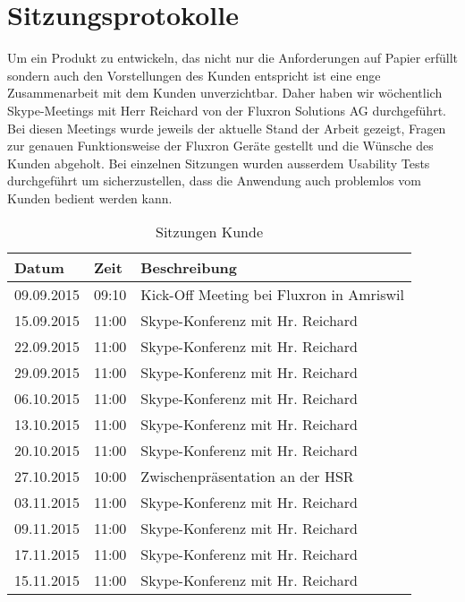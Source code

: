 \section{Sitzungsprotokolle}
\label{Sitzungsprotokolle}

Um ein Produkt zu entwickeln, das nicht nur die Anforderungen auf Papier erfüllt sondern auch den Vorstellungen des Kunden entspricht ist eine enge Zusammenarbeit mit dem Kunden unverzichtbar. Daher haben wir wöchentlich Skype-Meetings mit Herr Reichard von der Fluxron Solutions AG durchgeführt. Bei diesen Meetings wurde jeweils der aktuelle Stand der Arbeit gezeigt, Fragen zur genauen Funktionsweise der Fluxron Geräte gestellt und die Wünsche des Kunden abgeholt. Bei einzelnen Sitzungen wurden ausserdem Usability Tests durchgeführt um sicherzustellen, dass die Anwendung auch problemlos vom Kunden bedient werden kann.

\begin{table}[H]
\begin{tabularx}{\textwidth}{ l | l | X}
\textbf{Datum}& \textbf{Zeit} & \textbf{Beschreibung}\\ \hline
09.09.2015 & 09:10 & Kick-Off Meeting bei Fluxron in Amriswil\\ \hline
15.09.2015 & 11:00 & Skype-Konferenz mit Hr. Reichard\\ \hline
22.09.2015 & 11:00 & Skype-Konferenz mit Hr. Reichard\\ \hline
29.09.2015 & 11:00 & Skype-Konferenz mit Hr. Reichard\\ \hline
06.10.2015 & 11:00 & Skype-Konferenz mit Hr. Reichard\\ \hline
13.10.2015 & 11:00 & Skype-Konferenz mit Hr. Reichard\\ \hline
20.10.2015 & 11:00 & Skype-Konferenz mit Hr. Reichard\\ \hline
27.10.2015 & 10:00 & Zwischenpräsentation an der \ac{HSR}\\ \hline
03.11.2015 & 11:00 & Skype-Konferenz mit Hr. Reichard\\ \hline
09.11.2015 & 11:00 & Skype-Konferenz mit Hr. Reichard\\ \hline
17.11.2015 & 11:00 & Skype-Konferenz mit Hr. Reichard\\ \hline
15.11.2015 & 11:00 & Skype-Konferenz mit Hr. Reichard\\
\end{tabularx}
\caption{Sitzungen Kunde}
\end{table}

